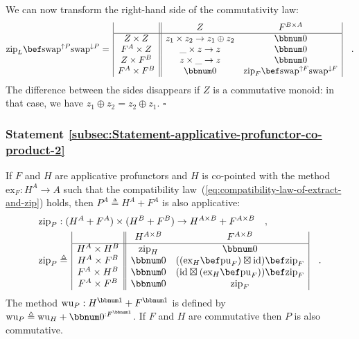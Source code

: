 We can now transform the right-hand side of the commutativity law:
\[
\text{zip}_{L}\bef\text{swap}^{\uparrow P}\text{swap}^{\downarrow P}=\,\begin{array}{|c||cc|}
 & Z & F^{B\times A}\\
\hline Z\times Z & z_{1}\times z_{2}\rightarrow z_{1}\oplus z_{2} & \bbnum 0\\
F^{A}\times Z & \_\times z\rightarrow z & \bbnum 0\\
Z\times F^{B} & z\times\_\rightarrow z & \bbnum 0\\
F^{A}\times F^{B} & \bbnum 0 & \text{zip}_{F}\bef\text{swap}^{\uparrow F}\text{swap}^{\downarrow F}
\end{array}\quad.
\]
The difference between the sides disappears if $Z$ is a commutative
monoid: in that case, we have $z_{1}\oplus z_{2}=z_{2}\oplus z_{1}$.
$\square$

\subsubsection{Statement \label{subsec:Statement-applicative-profunctor-co-product-2}\ref{subsec:Statement-applicative-profunctor-co-product-2}}

If $F$ and $H$ are applicative profunctors and $H$ is co-pointed
with the method $\text{ex}_{F}:H^{A}\rightarrow A$ such that the
compatibility law~(\ref{eq:compatibility-law-of-extract-and-zip})
holds, then $P^{A}\triangleq H^{A}+F^{A}$ is also applicative:
\begin{align*}
 & \text{zip}_{P}:(H^{A}+F^{A})\times(H^{B}+F^{B})\rightarrow H^{A\times B}+F^{A\times B}\quad,\\
 & \text{zip}_{P}\triangleq\,\begin{array}{|c||cc|}
 & H^{A\times B} & F^{A\times B}\\
\hline H^{A}\times H^{B} & \text{zip}_{H} & \bbnum 0\\
H^{A}\times F^{B} & \bbnum 0 & ((\text{ex}_{H}\bef\text{pu}_{F})\boxtimes\text{id})\bef\text{zip}_{F}\\
F^{A}\times H^{B} & \bbnum 0 & (\text{id}\boxtimes(\text{ex}_{H}\bef\text{pu}_{F}))\bef\text{zip}_{F}\\
F^{A}\times F^{B} & \bbnum 0 & \text{zip}_{F}
\end{array}\quad.
\end{align*}
The method $\text{wu}_{P}:H^{\bbnum 1}+F^{\bbnum 1}$ is defined by
$\text{wu}_{P}\triangleq\text{wu}_{H}+\bbnum 0^{:F^{\bbnum 1}}$.
If $F$ and $H$ are commutative then $P$ is also commutative.

